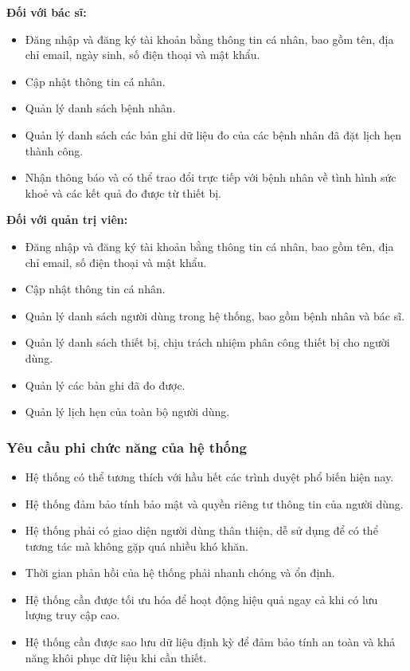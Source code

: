 \textbf{Đối với bác sĩ:}
\begin{adjustwidth}{1.5em}{}
\begin{itemize}
    \item Đăng nhập và đăng ký tài khoản bằng thông tin cá nhân, bao gồm tên, địa chỉ email, ngày sinh, số điện thoại và mật khẩu.
    \item Cập nhật thông tin cá nhân.
    \item Quản lý danh sách bệnh nhân.
    \item Quản lý danh sách các bản ghi dữ liệu đo của các bệnh nhân đã đặt lịch hẹn thành công.
    \item Nhận thông báo và có thể trao đổi trực tiếp với bệnh nhân về tình hình sức khoẻ và các kết quả đo được từ thiết bị.
\end{itemize}
\end{adjustwidth}
\textbf{Đối với quản trị viên:}
\begin{adjustwidth}{1.5em}{}
\begin{itemize}
    \item Đăng nhập và đăng ký tài khoản bằng thông tin cá nhân, bao gồm tên, địa chỉ email, số điện thoại và mật khẩu.
    \item Cập nhật thông tin cá nhân.
    \item Quản lý danh sách người dùng trong hệ thống, bao gồm bệnh nhân và bác sĩ.
    \item Quản lý danh sách thiết bị, chịu trách nhiệm phân công thiết bị cho người dùng.
    \item Quản lý các bản ghi đã đo được.
    \item Quản lý lịch hẹn của toàn bộ người dùng.
\end{itemize}
\end{adjustwidth}

\subsubsection{Yêu cầu phi chức năng của hệ thống}
\begin{itemize}
    \item Hệ thống có thể tương thích với hầu hết các trình duyệt phổ biến hiện nay.
    \item Hệ thống đảm bảo tính bảo mật và quyền riêng tư thông tin của người dùng.
    \item Hệ thống phải có giao diện người dùng thân thiện, dễ sử dụng để có thể tương tác mà không gặp quá nhiều khó khăn.
    \item Thời gian phản hồi của hệ thống phải nhanh chóng và ổn định.
    \item Hệ thống cần được tối ưu hóa để hoạt động hiệu quả ngay cả khi có lưu lượng truy cập cao.
    \item Hệ thống cần được sao lưu dữ liệu định kỳ để đảm bảo tính an toàn và khả năng khôi phục dữ liệu khi cần thiết.
\end{itemize}

